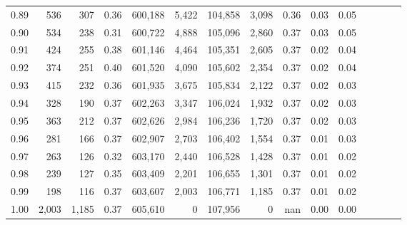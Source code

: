 \begin{tabular}{rrrcrrrrrrrrrrr}
0.89 &     536 &    307 &                                       0.36 &  600,188 &    5,422 &  104,858 &    3,098 &  0.36 &  0.03 &                         0.05 \\
0.90 &     534 &    238 &                                       0.31 &  600,722 &    4,888 &  105,096 &    2,860 &  0.37 &  0.03 &                         0.05 \\
0.91 &     424 &    255 &                                       0.38 &  601,146 &    4,464 &  105,351 &    2,605 &  0.37 &  0.02 &                         0.04 \\
0.92 &     374 &    251 &                                       0.40 &  601,520 &    4,090 &  105,602 &    2,354 &  0.37 &  0.02 &                         0.04 \\
0.93 &     415 &    232 &                                       0.36 &  601,935 &    3,675 &  105,834 &    2,122 &  0.37 &  0.02 &                         0.03 \\
0.94 &     328 &    190 &                                       0.37 &  602,263 &    3,347 &  106,024 &    1,932 &  0.37 &  0.02 &                         0.03 \\
0.95 &     363 &    212 &                                       0.37 &  602,626 &    2,984 &  106,236 &    1,720 &  0.37 &  0.02 &                         0.03 \\
0.96 &     281 &    166 &                                       0.37 &  602,907 &    2,703 &  106,402 &    1,554 &  0.37 &  0.01 &                         0.03 \\
0.97 &     263 &    126 &                                       0.32 &  603,170 &    2,440 &  106,528 &    1,428 &  0.37 &  0.01 &                         0.02 \\
0.98 &     239 &    127 &                                       0.35 &  603,409 &    2,201 &  106,655 &    1,301 &  0.37 &  0.01 &                         0.02 \\
0.99 &     198 &    116 &                                       0.37 &  603,607 &    2,003 &  106,771 &    1,185 &  0.37 &  0.01 &                         0.02 \\
1.00 &   2,003 &  1,185 &                                       0.37 &  605,610 &        0 &  107,956 &        0 &   nan &  0.00 &                         0.00 \\
\bottomrule
\end{tabular}
